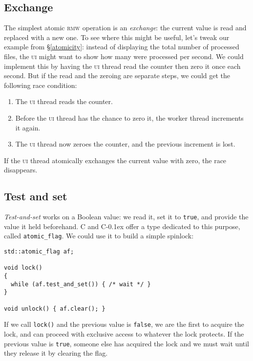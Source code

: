 \documentclass[fontsize=\bodyfontsize, numbers=endperiod]{scrartcl}
\newcommand{\codesize}{\fontsize{\bodyfontsize}{\bodybaselineskip}}
\newcommand{\monobox}[1]{\mbox{\texttt{#1}}}
\newcommand{\cpp}[1]{C\kern-0.1ex\raisebox{0.15ex}{\texttt{++}}{\addfontfeature{Numbers=LowercaseOff}#1}}
\newcommand{\introduce}[1]{\textit{#1}}
\newcommand{\secref}[1]{\hyperref[#1]{\textsc{\S}\ref*{#1}}}
\newenvironment{colfigure}
  {\par\vspace{1\baselineskip minus 0.5\baselineskip}\noindent\minipage{\linewidth}}
  {\endminipage\vspace{1\baselineskip minus 0.7\baselineskip}}
\begin{document}
\begin{multicols}{2}
\subsection{Exchange}
\label{exchange}

The simplest atomic \textsc{rmw} operation is an \introduce{exchange}:
the current value is read and replaced with a new one.
To see where this might be useful,
let's tweak our example from \secref{atomicity}:
instead of displaying the total number of processed files,
the \textsc{ui} might want to show how many were processed per second.
We could implement this by having the \textsc{ui} thread read the counter then
zero it once each second.
But if the read and the zeroing are separate steps,
we could get the following race condition:
\begin{enumerate}
\item The \textsc{ui} thread reads the counter.
\item Before the \textsc{ui} thread has the chance to zero it,
    the worker thread increments it again.
\item The \textsc{ui} thread now zeroes the counter, and the previous increment
    is lost.
\end{enumerate}
If the \textsc{ui} thread atomically exchanges the current value with zero,
the race disappears.

\subsection{Test and set}

\introduce{Test-and-set} works on a Boolean value:
we read it, set it to \texttt{true}, and provide the value it
held beforehand.
C and \cpp{} offer a type dedicated to this purpose, called \monobox{atomic\_flag}.
We could use it to build a simple spinlock:
\label{spinlock}
\begin{colfigure}
\begin{verbatim}
std::atomic_flag af;

void lock()
{
  while (af.test_and_set()) { /* wait */ }
}

void unlock() { af.clear(); }
\end{verbatim}
\end{colfigure}
If we call \texttt{lock()} and the previous value is
\texttt{false}, we are the first to acquire the lock,
and can proceed with exclusive access to whatever the lock protects.
If the previous value is \texttt{true},
someone else has acquired the lock and we must
wait until they release it by clearing the flag.


\end{multicols}
\end{document}
